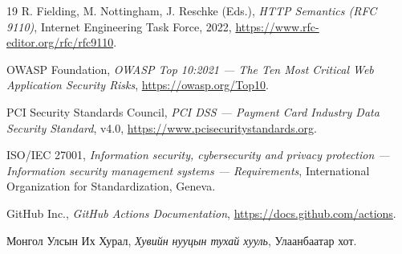 \documentclass[12pt,a4paper]{report}
\begin{document}
\begin{thebibliography}{19}
R. Fielding, M. Nottingham, J. Reschke (Eds.), \textit{HTTP Semantics
(RFC 9110)}, Internet Engineering Task Force, 2022,
\url{https://www.rfc-editor.org/rfc/rfc9110}.

OWASP Foundation, \textit{OWASP Top 10:2021 --- The Ten Most Critical
Web Application Security Risks}, \url{https://owasp.org/Top10}.

PCI Security Standards Council, \textit{PCI DSS --- Payment Card
Industry Data Security Standard}, v4.0,
\url{https://www.pcisecuritystandards.org}.

ISO/IEC 27001, \textit{Information security, cybersecurity and privacy
protection --- Information security management systems --- Requirements},
International Organization for Standardization, Geneva.

GitHub Inc., \textit{GitHub Actions Documentation},
\url{https://docs.github.com/actions}.

Монгол Улсын Их Хурал, \textit{Хувийн нууцын тухай хууль},
Улаанбаатар хот.

\end{thebibliography}
\end{document}
